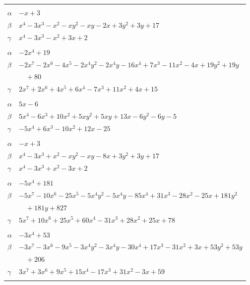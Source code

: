 \documentclass[11pt]{article}
\begin{document}
\begin{longtable}{@{}ll@{}}
\addlinespace[3pt]
\multicolumn{2}{@{}l}{$\{i,j\}=\{4,20\}$, $k_{ij}=2^{2}\cdot 5$}\\
$\alpha$ & $-x+3$\\
$\beta$ & $x^{4}-3x^{3}-x^{2}-xy^{2}-xy-2x+3y^{2}+3y+17$\\
$\gamma$ & $x^{4}-3x^{3}-x^{2}+3x+2$\\
\addlinespace[3pt]
\multicolumn{2}{@{}l}{$\{i,j\}=\{4,24\}$, $k_{ij}=3^{2}\cdot 11$}\\
$\alpha$ & $-2x^{4}+19$\\
$\beta$ & $-2x^{7}-2x^{6}-4x^{5}-2x^{4}y^{2}-2x^{4}y-16x^{4}+7x^{3}-11x^{2}-4x+19y^{2}+19y$\\
 & $\quad +80$\\
$\gamma$ & $2x^{7}+2x^{6}+4x^{5}+6x^{4}-7x^{3}+11x^{2}+4x+15$\\
\addlinespace[3pt]
\multicolumn{2}{@{}l}{$\{i,j\}=\{4,25\}$, $k_{ij}=2\cdot 7$}\\
$\alpha$ & $5x-6$\\
$\beta$ & $5x^{4}-6x^{3}+10x^{2}+5xy^{2}+5xy+13x-6y^{2}-6y-5$\\
$\gamma$ & $-5x^{4}+6x^{3}-10x^{2}+12x-25$\\
\addlinespace[3pt]
\multicolumn{2}{@{}l}{$\{i,j\}=\{4,31\}$, $k_{ij}=2^{4}$}\\
$\alpha$ & $-x+3$\\
$\beta$ & $x^{4}-3x^{3}+x^{2}-xy^{2}-xy-8x+3y^{2}+3y+17$\\
$\gamma$ & $x^{4}-3x^{3}+x^{2}-3x+2$\\
\addlinespace[3pt]
\multicolumn{2}{@{}l}{$\{i,j\}=\{4,34\}$, $k_{ij}=2^{4}\cdot 3^{2}\cdot 7$}\\
$\alpha$ & $-5x^{4}+181$\\
$\beta$ & $-5x^{7}-10x^{6}-25x^{5}-5x^{4}y^{2}-5x^{4}y-85x^{4}+31x^{3}-28x^{2}-25x+181y^{2}$\\
 & $\quad +181y+827$\\
$\gamma$ & $5x^{7}+10x^{6}+25x^{5}+60x^{4}-31x^{3}+28x^{2}+25x+78$\\
\addlinespace[3pt]
\multicolumn{2}{@{}l}{$\{i,j\}=\{4,35\}$, $k_{ij}=2^{3}\cdot 5^{2}$}\\
$\alpha$ & $-3x^{4}+53$\\
$\beta$ & $-3x^{7}-3x^{6}-9x^{5}-3x^{4}y^{2}-3x^{4}y-30x^{4}+17x^{3}-31x^{2}+3x+53y^{2}+53y$\\
 & $\quad +206$\\
$\gamma$ & $3x^{7}+3x^{6}+9x^{5}+15x^{4}-17x^{3}+31x^{2}-3x+59$\\
\addlinespace[3pt]

\end{longtable}
\end{document}
